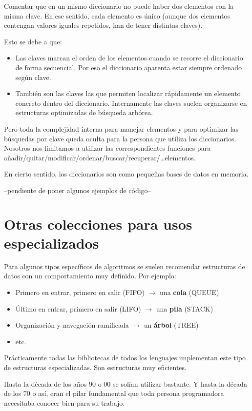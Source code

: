 \documentclass[spanish,12pt,a4paper,final,oneside]{book}
\begin{document}
Comentar que en un mismo diccionario no puede haber dos elementos con la misma clave. En ese sentido, cada elemento es único (aunque dos elementos contengan valores iguales repetidos, han de tener distintas claves).

Esto se debe a que:
\begin{itemize}
\item Las claves marcan el orden de los elementos cuando se recorre el diccionario de forma secuencial. Por eso el diccionario aparenta estar siempre ordenado según clave.
\item También son las claves las que permiten localizar rápidamente un elemento concreto dentro del diccionario. Internamente las claves suelen organizarse en estructuras optimizadas de búsqueda arbórea.
\end{itemize}

Pero toda la complejidad interna para manejar elementos y para optimizar las búsquedas por clave queda oculta para la persona que utiliza los diccionarios. Nosotros nos limitamos a utilizar las correspondientes funciones para añadir/quitar/modificar/ordenar/buscar/recuperar/\ldots elementos.

En cierto sentido, los diccionarios son como pequeñas bases de datos en memoria.

\vspace{1cm}
--pendiente de poner algunos ejemplos de código--


\section{Otras colecciones para usos especializados}
Para algunos tipos específicos de algoritmos se suelen recomendar estructuras de datos con un comportamiento muy definido. Por ejemplo:
\begin{itemize}
\item Primero en entrar, primero en salir (FIFO) $\rightarrow$ una \textbf{cola} (QUEUE)
\item Último en entrar, primero en salir (LIFO) $\rightarrow$ una \textbf{pila} (STACK)
\item Organización y navegación ramificada $\rightarrow$ un \textbf{árbol} (TREE)
\item etc.
\end{itemize}
Prácticamente todas las bibliotecas de todos los lenguajes  implementan este tipo de estructuras especializadas. Son estructuras muy eficientes. 

Hasta la década de los años 90 o 00 se solían utilizar bastante. Y hasta la década de los 70 o así, eran el pilar fundamental que toda persona programadora necesitaba conocer bien para su trabajo.
\end{document}
